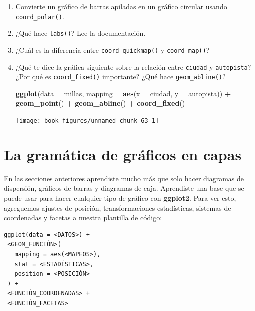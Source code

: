 \documentclass[11pt,oneside]{report}
\newenvironment{Shaded}{\begin{snugshade}}{\end{snugshade}}
\newcommand{\DataTypeTok}[1]{\textcolor[rgb]{0.13,0.29,0.53}{#1}}
\newcommand{\KeywordTok}[1]{\textcolor[rgb]{0.13,0.29,0.53}{\textbf{#1}}}
\newcommand{\NormalTok}[1]{#1}
\newcommand{\OperatorTok}[1]{\textcolor[rgb]{0.81,0.36,0.00}{\textbf{#1}}}
\newcommand{\StringTok}[1]{\textcolor[rgb]{0.31,0.60,0.02}{#1}}
\begin{document}
\begin{enumerate}
\def\labelenumi{\arabic{enumi}.}
\item
  Convierte un gráfico de barras apiladas en un gráfico circular usando
  \texttt{coord\_polar()}.
\item
  ¿Qué hace \texttt{labs()}? Lee la documentación.
\item
  ¿Cuál es la diferencia entre \texttt{coord\_quickmap()} y
  \texttt{coord\_map()}?
\item
  ¿Qué te dice la gráfica siguiente sobre la relación entre
  \texttt{ciudad} y \texttt{autopista}? ¿Por qué es
  \texttt{coord\_fixed()} importante? ¿Qué hace \texttt{geom\_abline()}?

\begin{Shaded}
\begin{Highlighting}[]
\KeywordTok{ggplot}\NormalTok{(}\DataTypeTok{data =}\NormalTok{ millas, }\DataTypeTok{mapping =} \KeywordTok{aes}\NormalTok{(}\DataTypeTok{x =}\NormalTok{ ciudad, }\DataTypeTok{y =}\NormalTok{ autopista)) }\OperatorTok{+}
\StringTok{  }\KeywordTok{geom_point}\NormalTok{() }\OperatorTok{+}
\StringTok{  }\KeywordTok{geom_abline}\NormalTok{() }\OperatorTok{+}
\StringTok{  }\KeywordTok{coord_fixed}\NormalTok{()}
\end{Highlighting}
\end{Shaded}

  \begin{center}\texttt{[image: book\_figures/unnamed-chunk-63-1]} \end{center}
\end{enumerate}

\hypertarget{la-gramuxe1tica-de-gruxe1ficos-en-capas}{%
\section{La gramática de gráficos en
capas}\label{la-gramuxe1tica-de-gruxe1ficos-en-capas}}

En las secciones anteriores aprendiste mucho más que solo hacer
diagramas de dispersión, gráficos de barras y diagramas de caja.
Aprendiste una base que se puede usar para hacer cualquier tipo de
gráfico con \textbf{ggplot2}. Para ver esto, agreguemos ajustes de
posición, transformaciones estadísticas, sistemas de coordenadas y
facetas a nuestra plantilla de código:

\begin{verbatim}
ggplot(data = <DATOS>) +
 <GEOM_FUNCIÓN>(
   mapping = aes(<MAPEOS>),
   stat = <ESTADÍSTICAS>,
   position = <POSICIÓN>
 ) +
 <FUNCIÓN_COORDENADAS> +
 <FUNCIÓN_FACETAS>
\end{verbatim}
\end{document}
